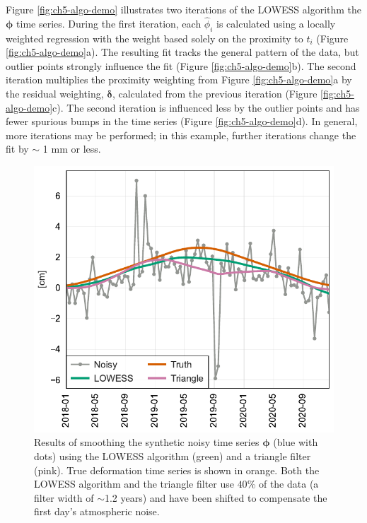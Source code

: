 Figure \ref{fig:ch5-algo-demo} illustrates two iterations of the LOWESS algorithm the $ \bm{\phi} $ time series.
During the first iteration, each $ \hat{\phi}_i $ is calculated using a locally weighted regression with the weight based solely on the proximity to $ t_i $ (Figure \ref{fig:ch5-algo-demo}a). The resulting fit tracks the general pattern of the data, but outlier points strongly influence the fit (Figure \ref{fig:ch5-algo-demo}b). 
The second iteration multiplies the proximity weighting from Figure \ref{fig:ch5-algo-demo}a by the residual weighting, $ \bm{\delta} $, calculated from the previous iteration (Figure \ref{fig:ch5-algo-demo}c).
The second iteration is influenced less by the outlier points and has fewer spurious bumps in the time series (Figure \ref{fig:ch5-algo-demo}d). In general, more iterations may be performed; in this example, further iterations change the fit by $ \sim $ 1 mm or less.


\FloatBarrier


\begin{figure}[!h]
	\centering
	\includegraphics[width=.99\textwidth]{figures/chapter5-lowess/figure4-compare-tri-ts-only.pdf}
	\caption[Comparison of LOWESS smoothing to triangle filter for synthetic data]{
		Results of smoothing the synthetic noisy time series $ \bm{\phi} $ (blue with dots) using the LOWESS algorithm (green) and a triangle filter (pink). True deformation time series is shown in orange. Both the LOWESS algorithm and the triangle filter use $ 40 $\% of the data (a filter width of $ \sim $1.2 years) and have been shifted to compensate the first day's atmospheric noise.
}
	\label{fig:ch5-compare-tri}
\end{figure}

